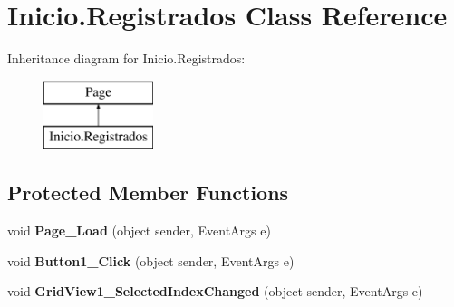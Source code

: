 \hypertarget{class_inicio_1_1_registrados}{}\section{Inicio.\+Registrados Class Reference}
\label{class_inicio_1_1_registrados}
Inheritance diagram for Inicio.\+Registrados\+:\begin{figure}[H]
\begin{center}
\leavevmode
\includegraphics[height=2.000000cm]{class_inicio_1_1_registrados}
\end{center}
\end{figure}
\subsection*{Protected Member Functions}
\begin{DoxyCompactItemize}
\item 
\mbox{\label{class_inicio_1_1_registrados_abcd4568d8c98855d98174d384c597063}} 
void {\bfseries Page\+\_\+\+Load} (object sender, Event\+Args e)
\item 
\mbox{\label{class_inicio_1_1_registrados_a3f8a14965116a309bdfe026bf3d6d743}} 
void {\bfseries Button1\+\_\+\+Click} (object sender, Event\+Args e)
\item 
\mbox{\label{class_inicio_1_1_registrados_a92b0d0a8bd9eed0d89fe34bd2af00454}} 
void {\bfseries Grid\+View1\+\_\+\+Selected\+Index\+Changed} (object sender, Event\+Args e)
\end{DoxyCompactItemize}

